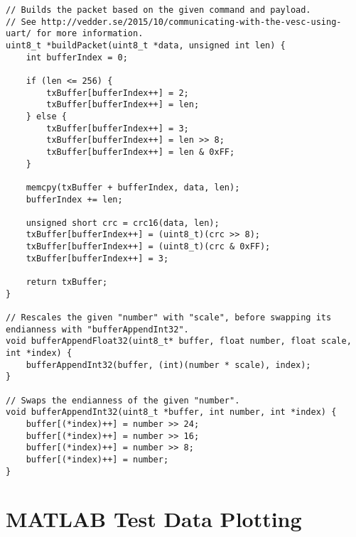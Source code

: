 \begin{lstlisting}[escapeinside=``]
// Builds the packet based on the given command and payload.
// See http://vedder.se/2015/10/communicating-with-the-vesc-using-uart/ for more information.
uint8_t *buildPacket(uint8_t *data, unsigned int len) {
    int bufferIndex = 0;

    if (len <= 256) {
        txBuffer[bufferIndex++] = 2;
        txBuffer[bufferIndex++] = len;
    } else {
        txBuffer[bufferIndex++] = 3;
        txBuffer[bufferIndex++] = len >> 8;
        txBuffer[bufferIndex++] = len & 0xFF;
    }

    memcpy(txBuffer + bufferIndex, data, len);
    bufferIndex += len;

    unsigned short crc = crc16(data, len);
    txBuffer[bufferIndex++] = (uint8_t)(crc >> 8);
    txBuffer[bufferIndex++] = (uint8_t)(crc & 0xFF);
    txBuffer[bufferIndex++] = 3;

    return txBuffer;
}

// Rescales the given "number" with "scale", before swapping its endianness with "bufferAppendInt32".
void bufferAppendFloat32(uint8_t* buffer, float number, float scale, int *index) {
    bufferAppendInt32(buffer, (int)(number * scale), index);
}

// Swaps the endianness of the given "number".
void bufferAppendInt32(uint8_t *buffer, int number, int *index) {
    buffer[(*index)++] = number >> 24;
    buffer[(*index)++] = number >> 16;
    buffer[(*index)++] = number >> 8;
    buffer[(*index)++] = number;
}
\end{lstlisting}

\newpage

\section{MATLAB Test Data Plotting} \label{code:plotting}

\lstset{
    language=Matlab,
}

